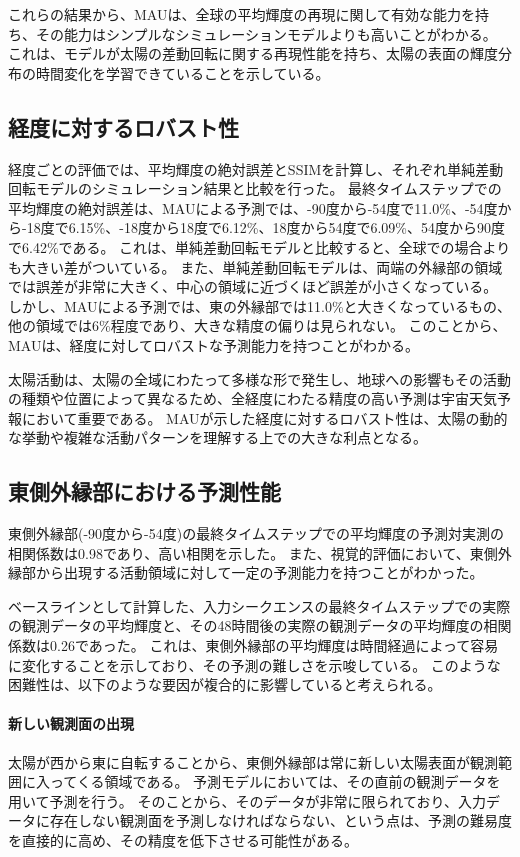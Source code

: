       これらの結果から、MAUは、全球の平均輝度の再現に関して有効な能力を持ち、その能力はシンプルなシミュレーションモデルよりも高いことがわかる。
      これは、モデルが太陽の差動回転に関する再現性能を持ち、太陽の表面の輝度分布の時間変化を学習できていることを示している。
    
    \subsection{経度に対するロバスト性}
      経度ごとの評価では、平均輝度の絶対誤差とSSIMを計算し、それぞれ単純差動回転モデルのシミュレーション結果と比較を行った。
      最終タイムステップでの平均輝度の絶対誤差は、MAUによる予測では、-90度から-54度で11.0\%、-54度から-18度で6.15\%、-18度から18度で6.12\%、18度から54度で6.09\%、54度から90度で6.42\%である。
      これは、単純差動回転モデルと比較すると、全球での場合よりも大きい差がついている。
      また、単純差動回転モデルは、両端の外縁部の領域では誤差が非常に大きく、中心の領域に近づくほど誤差が小さくなっている。
      しかし、MAUによる予測では、東の外縁部では11.0\%と大きくなっているもの、他の領域では6\%程度であり、大きな精度の偏りは見られない。
      このことから、MAUは、経度に対してロバストな予測能力を持つことがわかる。
      
      太陽活動は、太陽の全域にわたって多様な形で発生し、地球への影響もその活動の種類や位置によって異なるため、全経度にわたる精度の高い予測は宇宙天気予報において重要である。
      MAUが示した経度に対するロバスト性は、太陽の動的な挙動や複雑な活動パターンを理解する上での大きな利点となる。
      
    \subsection{東側外縁部における予測性能}
      東側外縁部(-90度から-54度)の最終タイムステップでの平均輝度の予測対実測の相関係数は0.98であり、高い相関を示した。
      また、視覚的評価において、東側外縁部から出現する活動領域に対して一定の予測能力を持つことがわかった。

      ベースラインとして計算した、入力シークエンスの最終タイムステップでの実際の観測データの平均輝度と、その48時間後の実際の観測データの平均輝度の相関係数は0.26であった。
      これは、東側外縁部の平均輝度は時間経過によって容易に変化することを示しており、その予測の難しさを示唆している。
      このような困難性は、以下のような要因が複合的に影響していると考えられる。
      \paragraph{新しい観測面の出現}
        太陽が西から東に自転することから、東側外縁部は常に新しい太陽表面が観測範囲に入ってくる領域である。
        予測モデルにおいては、その直前の観測データを用いて予測を行う。
        そのことから、そのデータが非常に限られており、入力データに存在しない観測面を予測しなければならない、という点は、予測の難易度を直接的に高め、その精度を低下させる可能性がある。
